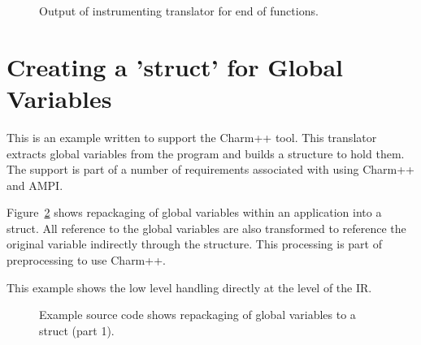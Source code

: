 \begin{figure}[!ht]
{\indent
{\mySmallFontSize


\begin{latexonly}
   
\end{latexonly}

\begin{htmlonly}
   
\end{htmlonly}

}
}

\caption{Output of instrumenting translator for end of functions.}
\label{Tutorial:rose_inputCode_instrumentEndOfFunction}
\end{figure}

\section{Creating a 'struct' for Global Variables}
   This is an example written to support the Charm++ tool. This translator
extracts global variables from the program and builds a structure to hold them.
The support is part of a number of requirements associated with using Charm++
and AMPI.

   Figure~\ref{Tutorial:exampleGlobalVariableHandling} shows repackaging of global
variables within an application into a struct. All reference to the global variables
are also transformed to reference the original variable indirectly through the structure.
This processing is part of preprocessing to use Charm++.  

   This example shows the low level handling directly at the level of the IR.

\begin{figure}[!h]
{\indent
{\mySmallestFontSize


\begin{latexonly}
%  
   
\end{latexonly}

\begin{htmlonly}
   
\end{htmlonly}

}
}
\caption{Example source code shows repackaging of global variables to a struct (part 1).}
\label{Tutorial:exampleGlobalVariableHandling}
\end{figure}

